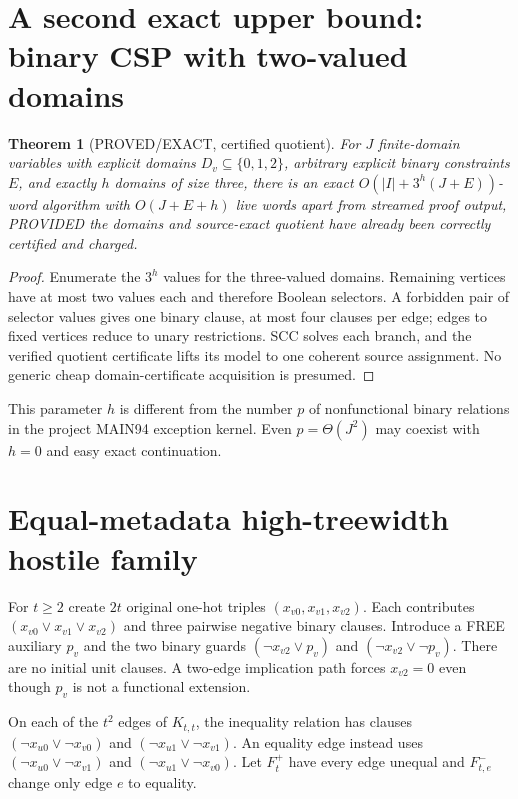 \documentclass[11pt]{article}
\newtheorem{theorem}{Theorem}
\begin{document}
\section{A second exact upper bound: binary CSP with two-valued domains}
\begin{theorem}[PROVED/EXACT, certified quotient]
For $J$ finite-domain variables with explicit domains $D_v\subseteq\{0,1,2\}$, arbitrary explicit binary constraints $E$, and exactly $h$ domains of size three, there is an exact $O(|I|+3^h(J+E))$-word algorithm with $O(J+E+h)$ live words apart from streamed proof output, PROVIDED the domains and source-exact quotient have already been correctly certified and charged.
\end{theorem}
\begin{proof}
Enumerate the $3^h$ values for the three-valued domains. Remaining vertices have at most two values each and therefore Boolean selectors. A forbidden pair of selector values gives one binary clause, at most four clauses per edge; edges to fixed vertices reduce to unary restrictions. SCC solves each branch, and the verified quotient certificate lifts its model to one coherent source assignment. No generic cheap domain-certificate acquisition is presumed.
\end{proof}

This parameter $h$ is different from the number $p$ of nonfunctional binary relations in the project MAIN94 exception kernel. Even $p=\Theta(J^2)$ may coexist with $h=0$ and easy exact continuation.

\section{Equal-metadata high-treewidth hostile family}
For $t\ge2$ create $2t$ original one-hot triples $(x_{v0},x_{v1},x_{v2})$. Each contributes $(x_{v0}\vee x_{v1}\vee x_{v2})$ and three pairwise negative binary clauses. Introduce a FREE auxiliary $p_v$ and the two binary guards $(\neg x_{v2}\vee p_v)$ and $(\neg x_{v2}\vee\neg p_v)$. There are no initial unit clauses. A two-edge implication path forces $x_{v2}=0$ even though $p_v$ is not a functional extension.

On each of the $t^2$ edges of $K_{t,t}$, the inequality relation has clauses $(\neg x_{u0}\vee\neg x_{v0})$ and $(\neg x_{u1}\vee\neg x_{v1})$. An equality edge instead uses $(\neg x_{u0}\vee\neg x_{v1})$ and $(\neg x_{u1}\vee\neg x_{v0})$. Let $F_t^+$ have every edge unequal and $F_{t,e}^-$ change only edge $e$ to equality.
\end{document}
